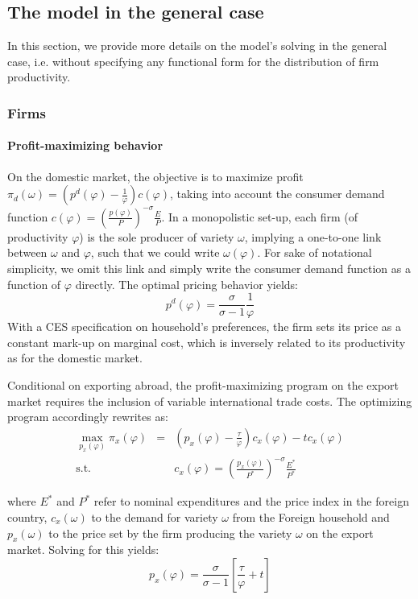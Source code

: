 \documentclass[a4paper,11pt]{article}
\begin{document}
\subsection{The model in the general case}

In this section, we provide more details on the model's solving in the general case, i.e. without specifying any functional form for the distribution of firm productivity.

\subsubsection{Firms}

\paragraph{Profit-maximizing behavior}

On the domestic market, the objective is to maximize profit $\pi_d(\omega)= \left(p^d(\varphi) -\frac{1}{\varphi}  \right)c(\varphi)$, taking into account the consumer demand function $c(\varphi) = \left(\frac{p(\varphi)}{P}  \right)^{-\sigma} \frac{E}{P}$. In a monopolistic set-up, each firm (of productivity $\varphi$) is the sole producer of variety $\omega$, implying a one-to-one link between $\omega$ and $\varphi$, such that we could write $\omega(\varphi)$. For sake of notational simplicity, we omit this link and simply write the consumer demand function as a function of $\varphi$ directly.
The optimal pricing behavior yields:
$$p^d(\varphi) = \frac{\sigma}{\sigma-1}\frac{1}{\varphi}$$
With a CES specification on household's preferences, the firm sets its price as a constant mark-up on marginal cost, which is inversely related to its productivity as for the domestic market. \medskip

Conditional on exporting abroad, the profit-maximizing program on the export market requires the inclusion of variable international trade costs. The optimizing program accordingly rewrites as:
\begin{eqnarray*}
\max_{p_x(\varphi)} \pi_x(\varphi) &=& \left(p_x(\varphi) -\frac{\tau}{\varphi}  \right)c_x(\varphi) - tc_x(\varphi) \\
\text{s.t. }&&c_x(\varphi) = \left(\frac{p_x(\varphi)}{P^\ast}  \right)^{-\sigma} \frac{E^\ast}{P^\ast}
\end{eqnarray*}

\noindent where $E^\ast$ and $P^\ast$ refer to nominal expenditures and the price index in the foreign country, $c_x(\omega)$ to the demand for variety $\omega$ from the Foreign household and $p_x(\omega)$ to the price set by the firm producing the variety $\omega$ on the export market. Solving for this yields:
\begin{equation}
p_x(\varphi) = \frac{\sigma}{\sigma-1}\left[\frac{\tau}{\varphi} +t \right] \label{eq:px}
\end{equation}
\end{document}
